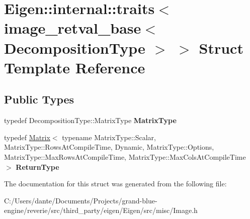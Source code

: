 \hypertarget{struct_eigen_1_1internal_1_1traits_3_01image__retval__base_3_01_decomposition_type_01_4_01_4}{}\section{Eigen\+::internal\+::traits$<$ image\+\_\+retval\+\_\+base$<$ Decomposition\+Type $>$ $>$ Struct Template Reference}
\label{struct_eigen_1_1internal_1_1traits_3_01image__retval__base_3_01_decomposition_type_01_4_01_4}
\subsection*{Public Types}
\begin{DoxyCompactItemize}
\item 
\mbox{\label{struct_eigen_1_1internal_1_1traits_3_01image__retval__base_3_01_decomposition_type_01_4_01_4_a984a2d61b1d9938a50ac081801969a76}} 
typedef Decomposition\+Type\+::\+Matrix\+Type {\bfseries Matrix\+Type}
\item 
\mbox{\label{struct_eigen_1_1internal_1_1traits_3_01image__retval__base_3_01_decomposition_type_01_4_01_4_a0dd246199d9ee579731c1567a1769572}} 
typedef \mbox{\hyperlink{class_eigen_1_1_matrix}{Matrix}}$<$ typename Matrix\+Type\+::\+Scalar, Matrix\+Type\+::\+Rows\+At\+Compile\+Time, Dynamic, Matrix\+Type\+::\+Options, Matrix\+Type\+::\+Max\+Rows\+At\+Compile\+Time, Matrix\+Type\+::\+Max\+Cols\+At\+Compile\+Time $>$ {\bfseries Return\+Type}
\end{DoxyCompactItemize}


The documentation for this struct was generated from the following file\+:\begin{DoxyCompactItemize}
\item 
C\+:/\+Users/dante/\+Documents/\+Projects/grand-\/blue-\/engine/reverie/src/third\+\_\+party/eigen/\+Eigen/src/misc/Image.\+h\end{DoxyCompactItemize}
